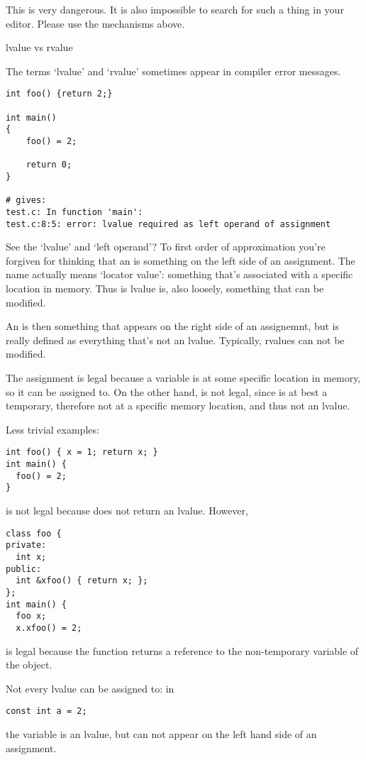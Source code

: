 This is very dangerous. It is also impossible to search for such a
thing in your editor. Please use the mechanisms above.

 {lvalue vs rvalue}
\label{sec:lrvalue}

The terms `lvalue' and `rvalue' sometimes appear in compiler error
messages.
\begin{verbatim}
int foo() {return 2;}

int main()
{
    foo() = 2;

    return 0;
}

# gives:
test.c: In function 'main':
test.c:8:5: error: lvalue required as left operand of assignment
\end{verbatim}

See the `lvalue' and `left operand'? To first order of approximation
you're forgiven for thinking that an  is something
on the left side of an assignment. The name actually means `locator
value': something that's associated with a specific location in
memory. Thus is lvalue is, also loosely, something that can be modified.

An  is then something that appears on the right
side of an assignemnt, but is really defined as everything that's not
an lvalue. Typically, rvalues can not be modified.

The assignment  is legal because a variable  is at some specific
location in memory, so it can be assigned to. On the other hand,
 is not legal, since  is at best a temporary,
therefore not at a specific memory location, and thus not an lvalue.

Less trivial examples:
\begin{verbatim}
int foo() { x = 1; return x; }
int main() {
  foo() = 2;
}
\end{verbatim}
is not legal because  does not return an lvalue. However,
\begin{verbatim}
class foo {
private:
  int x;
public:
  int &xfoo() { return x; };
};
int main() {
  foo x;
  x.xfoo() = 2;
\end{verbatim}
is legal because the function  returns a reference to the
non-temporary variable  of the  object.

Not every lvalue can be assigned to: in
\begin{verbatim}
const int a = 2;
\end{verbatim}
the variable  is an lvalue, but can not appear on the left hand
side of an assignment.

